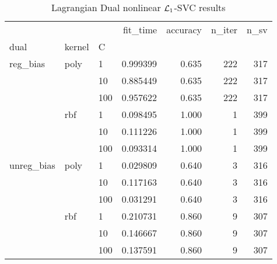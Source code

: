 \begin{table}[H]
\centering
\caption{Lagrangian Dual nonlinear $\protect \mathcal{L}_1$-SVC results}
\label{nonlinear_lagrangian_dual_l1_svc_cv_results}
\begin{tabular}{lllrrrr}
\toprule
           &     &     &  fit\_time &  accuracy &  n\_iter &  n\_sv \\
dual & kernel & C &           &           &         &       \\
\midrule
reg\_bias & poly & 1   &  0.999399 &     0.635 &     222 &   317 \\
           &     & 10  &  0.885449 &     0.635 &     222 &   317 \\
           &     & 100 &  0.957622 &     0.635 &     222 &   317 \\
           & rbf & 1   &  0.098495 &     1.000 &       1 &   399 \\
           &     & 10  &  0.111226 &     1.000 &       1 &   399 \\
           &     & 100 &  0.093314 &     1.000 &       1 &   399 \\
unreg\_bias & poly & 1   &  0.029809 &     0.640 &       3 &   316 \\
           &     & 10  &  0.117163 &     0.640 &       3 &   316 \\
           &     & 100 &  0.031291 &     0.640 &       3 &   316 \\
           & rbf & 1   &  0.210731 &     0.860 &       9 &   307 \\
           &     & 10  &  0.146667 &     0.860 &       9 &   307 \\
           &     & 100 &  0.137591 &     0.860 &       9 &   307 \\
\bottomrule
\end{tabular}
\end{table}
